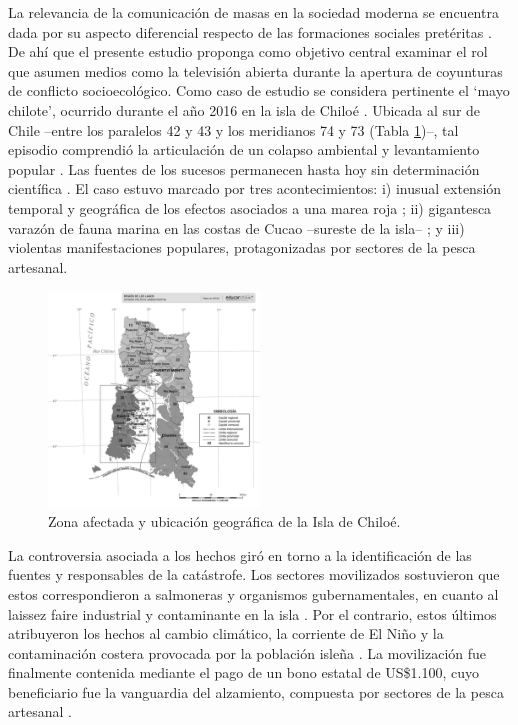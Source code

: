 \documentclass{textolivre}
\begin{document}
La relevancia de la comunicación de masas en la sociedad moderna se encuentra
dada por su aspecto diferencial respecto de las formaciones sociales pretéritas
\cite{Habermas2006}. De ahí que el presente estudio proponga como objetivo central
examinar el rol que asumen medios como la televisión abierta durante la apertura de
coyunturas de conflicto socioecológico. Como caso de estudio se considera pertinente el
‘mayo chilote’, ocurrido durante el año 2016 en la isla de Chiloé \cite{ValdebenitoAllendes2018}.
Ubicada al sur de Chile --entre los paralelos 42 y 43 y los meridianos 74 y 73 (Tabla \ref{fig01})--, tal episodio comprendió la articulación de un colapso ambiental y levantamiento
popular \cite{cabello2018,roman2016}. Las fuentes de los
sucesos permanecen hasta hoy sin determinación científica \cite{buschmann2016,t13b}. 
El caso estuvo marcado por tres acontecimientos: i) inusual extensión
temporal y geográfica de los efectos asociados a una marea roja \cite{burrows2016}; ii)
gigantesca varazón de fauna marina en las costas de Cucao --sureste de la isla-- \cite{cnnchile2016b}; 
y iii) violentas manifestaciones populares, protagonizadas por sectores de
la pesca artesanal.

\begin{figure}[htbp]
 \centering
 \includegraphics[width=0.5\textwidth]{figure001.pdf}
 \caption{Zona afectada y ubicación geográfica de la Isla de Chiloé.}
 \label{fig01}
\end{figure}

La controversia asociada a los hechos giró en torno a la identificación de las
fuentes y responsables de la catástrofe. Los sectores movilizados sostuvieron que estos
correspondieron a salmoneras y organismos gubernamentales, en cuanto al laissez faire
industrial y contaminante en la isla \cite{agenciaefe}. Por el contrario, estos últimos
atribuyeron los hechos al cambio climático, la corriente de El Niño y la contaminación
costera provocada por la población isleña \cite{infante2016,salmonexpert}. La
movilización fue finalmente contenida mediante el pago de un bono estatal de US\$1.100,
cuyo beneficiario fue la vanguardia del alzamiento, compuesta por sectores de la pesca
artesanal \cite{24horasb}.
\end{document}
